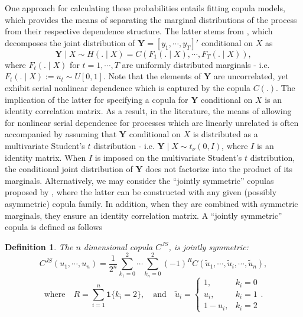 \documentclass[harvard,11pt]{article}
\newtheorem{definition}{Definition}
\begin{document}
One approach for calculating these probabilities entails fitting copula models, which provides the means of separating the marginal distributions of the process from their respective dependence structure. The latter stems from \citet{sklar1959fonctions}, which decomposes the joint distribution of $\bm{Y}=[y_1,\cdots,y_T]'$ conditional on $X$ as
\[
\bm{Y}\mid X \sim H(.\mid X)=C\left(F_1(.\mid X),\cdots,F_T(.\mid X)\right),
\] 
where $F_t(.\mid X)$ for $t=1,\cdots,T$ are uniformly distributed marginals - i.e. $F_t(.\mid X):= u_t\sim U[0,1]$. Note that the elements of $\bm{Y}$ are uncorrelated, yet exhibit serial nonlinear dependence which is captured by the copula $C(.)$. The implication of the latter for specifying a copula for $\bm{Y}$ conditional on $X$ is an identity correlation matrix. As a result, in the literature, the means of allowing for nonlinear serial dependence for processes which are linearly unrelated is often accompanied by assuming that $\bm{Y}$ conditional on $X$ is distributed as a multivariate Student's $t$ distribution - i.e. $\bm{Y}\mid X\sim t_{\nu}(0,I)$, where $I$ is an identity matrix. When $I$ is imposed on the multivariate Student's $t$ distribution, the conditional joint distribution of $\bm{Y}$ does not factorize into the product of its marginals. Alternatively, we may consider the \textquotedblleft jointly symmetric\textquotedblright{ }copulas proposed by \citet{oh2016high}, where the latter can be constructed with any given (possibly asymmetric) copula family. In addition, when they are combined with symmetric marginals, they ensure an identity correlation matrix. A \textquotedblleft jointly symmetric\textquotedblright{ }copula is defined as follows
\begin{definition}
The $n$ dimensional copula $C^{JS}$, is jointly symmetric:
\[
C^{JS}\left(u_1,\cdots,u_n\right)=\frac{1}{2^n}\sum\limits_{k_1=0}^{2}\cdots\sum\limits_{k_n=0}^{2}\left(-1\right)^R C(\tilde{u}_1,\cdots,\tilde{u}_i,\cdots,\tilde{u}_n),
\] 
\[
\text{where}\quad R=\sum\limits_{i=1}^n\bm{1}\{k_i=2\},\quad\text{and}\quad\tilde{u}_i=
\begin{cases}
1,& k_i=0\\
u_i,&k_i=1\\
1-u_i,& k_i=2
\end{cases}.
\]
 \end{definition}
\end{document}
